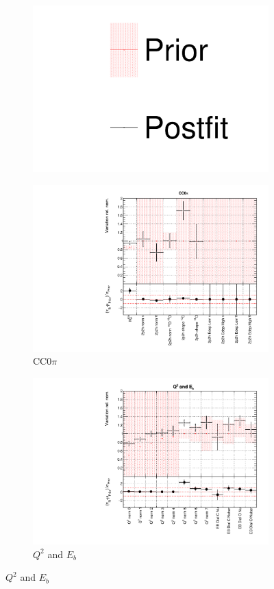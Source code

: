 \begin{figure}[!htbp]
\centering
\begin{subfigure}{0.95\textwidth}
  \centering
  \includegraphics[width=0.25\linewidth]{figs/dat_leg}
\end{subfigure}
\begin{subfigure}{0.49\textwidth}
  \centering
  \includegraphics[width=0.9\linewidth]{figs/datxsec1}
  \caption{CC0$\pi$}
\end{subfigure}
\begin{subfigure}{0.49\textwidth}
  \centering
  \includegraphics[width=0.9\linewidth]{figs/datxsec2}
  \caption{$Q^2$ and $E_b$}
\end{subfigure}

\end{figure}

